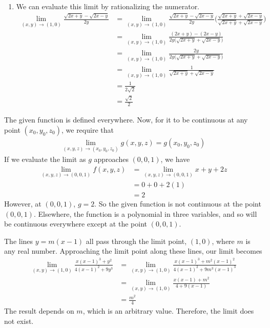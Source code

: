 \begin{enumerate}
\item  We can evaluate this limit by rationalizing the numerator.
\begin{align*}
  \lim_{(x,y)\rightarrow(1,0) } \frac{\sqrt{2x+y}-\sqrt{2x-y}}{2y} &= 
  \lim_{(x,y)\rightarrow(1,0) } \frac{\sqrt{2x+y}-\sqrt{2x-y}}{2y} \Bigg(\frac{\sqrt{2x+y}+\sqrt{2x-y}}{\sqrt{2x+y}+\sqrt{2x-y}} \Bigg) \\
  &=\lim_{(x,y)\rightarrow(1,0) } \frac{(2x+y)-(2x-y)}{2y \Big(\sqrt{2x+y}+\sqrt{2x-y} \Big)}  \\
  &=\lim_{(x,y)\rightarrow(1,0) } \frac{2y}{2y \Big(\sqrt{2x+y}+\sqrt{2x-y} \Big)}  \\
  &=\lim_{(x,y)\rightarrow(1,0) } \frac{1}{\sqrt{2x+y}+\sqrt{2x-y} }  \\
  &= \frac{1}{2\sqrt{2} }\\
  &= \frac{\sqrt{2}}{2}
\end{align*}
\end{enumerate}
\item
The given function is defined everywhere. Now, for it to be continuous at any point $(x_0,y_0,z_0)$, we require that 
\begin{align*} 
   \lim_{(x,y,z)\rightarrow(x_0,y_0,z_0) } g(x,y,z) = g(x_0,y_0,z_0)
 \end{align*}
If we evaluate the limit as $g$ approaches $(0,0,1)$, we have
\begin{align*}
\lim_{(x,y,z)\rightarrow(0,0,1) } f(x,y,z) 
&= \lim_{(x,y,z)\rightarrow(0,0,1) } x+y+2z \\
&= 0+0+2(1) \\
&= 2
\end{align*}
However, at $(0,0,1)$, $g = 2$. So the given function is not continuous at the point $(0,0,1)$. Elsewhere, the function is a polynomial in three variables, and so will be continuous everywhere except at the point $(0,0,1)$. 
\item The lines $y=m(x-1)$ all pass through the limit point, $(1,0)$, where $m$ is any real number. Approaching the limit point along these lines, our limit becomes
\begin{align*} 
   \lim_{(x,y)\rightarrow(1,0) } \frac{x(x-1)^3 + y^2}{4(x-1)^2+9y^3} 
   &= \lim_{(x,y)\rightarrow(1,0) } \frac{x(x-1)^3 + m^2(x-1)^2}{4(x-1)^2+9m^3(x-1)^3} \\
   &= \lim_{(x,y)\rightarrow(1,0) } \frac{x(x-1) + m^2}{4+9(x-1)} \\
   &= \frac{m^2}{4}
 \end{align*}
 The result depends on $m$, which is an arbitrary value. Therefore, the limit does not exist. 

